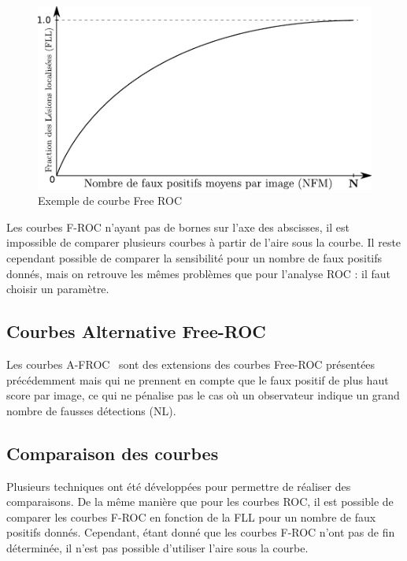 \begin{figure}[h]
	\begin{center}
	\includegraphics[width=15cm]{images/FROC}
	\end{center}
	\caption{Exemple de courbe Free ROC}
	\label{fig:courbeFROC}
\end{figure}

Les courbes F-ROC n'ayant pas de bornes sur l’axe des abscisses, il est impossible de comparer plusieurs courbes à partir de l'aire sous la courbe. Il reste cependant possible de comparer la sensibilité pour un nombre de faux positifs donnés, mais on retrouve les mêmes problèmes que pour l'analyse ROC : il faut choisir un paramètre.

\subsection{Courbes Alternative Free-ROC}

Les courbes A-FROC~\cite{chakraborty1990free} sont des extensions des courbes Free-ROC présentées précédemment mais qui ne prennent en compte que le faux positif de plus haut score par image, ce qui ne pénalise pas le cas où un observateur indique un grand nombre de fausses détections (NL).

\subsection{Comparaison des courbes}
\label{lab:AFROC}
Plusieurs techniques ont été développées pour permettre de réaliser des comparaisons. De la même manière que pour les courbes ROC, il est possible de comparer les courbes F-ROC en fonction de la FLL pour un nombre de faux positifs donnés. Cependant, étant donné que les courbes F-ROC n'ont pas de fin déterminée, il n'est pas possible d'utiliser l'aire sous la courbe. 

